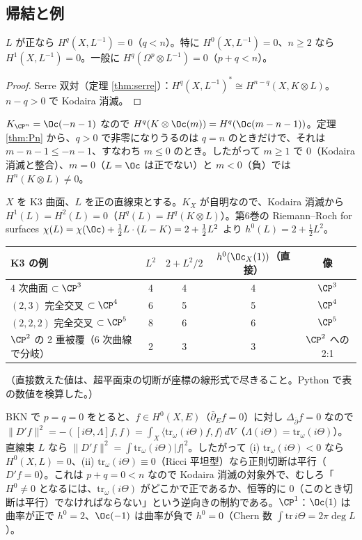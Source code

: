 \subsection{帰結と例}
\begin{cor}\label{cor:negvanish}\tP
$L$ が正なら $H^q(X,L^{-1})=0$（$q<n$）。特に $H^0(X,L^{-1})=0$、$n\ge2$ なら $H^1(X,L^{-1})=0$。一般に $H^q(\Omega^p\otimes L^{-1})=0$（$p+q<n$）。
\end{cor}
\begin{proof}
Serre 双対（定理 \ref{thm:serre}）：$H^q(X,L^{-1})^*\cong H^{n-q}(X,K\otimes L)$。$n-q>0$ で Kodaira 消滅。
\end{proof}
\begin{ex}[$\CP^n$]
$K_{\CP^n}=\Oc(-n-1)$ なので $H^q(K\otimes\Oc(m))=H^q(\Oc(m-n-1))$。定理 \ref{thm:Pn} から、$q>0$ で非零になりうるのは $q=n$ のときだけで、それは $m-n-1\le-n-1$、すなわち $m\le0$ のとき。したがって $m\ge1$ で $0$（Kodaira 消滅と整合）、$m=0$（$L=\Oc$ は正でない）と $m<0$（負）では $H^n(K\otimes L)\neq0$。
\end{ex}
\begin{ex}[K3 曲面で $h^0(L)=2+\tfrac12L^2$]\label{ex:K3h0}
$X$ を K3 曲面、$L$ を正の直線束とする。$K_X$ が自明なので、Kodaira 消滅から $H^1(L)=H^2(L)=0$（$H^q(L)=H^q(K\otimes L)$）。第6巻の Riemann--Roch for surfaces $\chi(L)=\chi(\Oc)+\frac12L\cdot(L-K)=2+\frac12L^2$ より $h^0(L)=2+\frac12L^2$。
\begin{center}\small
\begin{tabular}{lcccc}
\toprule
K3 の例 & $L^2$ & $2+L^2/2$ & $h^0(\Oc_X(1))$（直接）& 像\\\midrule
4 次曲面 $\subset\CP^3$ & 4 & 4 & 4 & $\CP^3$\\
$(2,3)$ 完全交叉 $\subset\CP^4$ & 6 & 5 & 5 & $\CP^4$\\
$(2,2,2)$ 完全交叉 $\subset\CP^5$ & 8 & 6 & 6 & $\CP^5$\\
$\CP^2$ の 2 重被覆（6 次曲線で分岐） & 2 & 3 & 3 & $\CP^2$ への 2:1 \\\bottomrule
\end{tabular}
\end{center}
（直接数えた値は、超平面束の切断が座標の線形式で尽きること。Python で表の数値を検算した。）
\end{ex}
\begin{ex}\label{ex:bochner}
BKN で $p=q=0$ をとると、$f\in H^0(X,E)$（$\bar\partial_Ef=0$）に対し $\Delta_{\bar\partial}f=0$ なので $\|D'f\|^2=-([i\Theta,\Lambda]f,f)=\int_X\langle\mathrm{tr}_\omega(i\Theta)f,f\rangle\,dV$（$\Lambda(i\Theta)=\mathrm{tr}_\omega(i\Theta)$）。直線束 $L$ なら $\|D'f\|^2=\int\mathrm{tr}_\omega(i\Theta)|f|^2$。したがって (i) $\mathrm{tr}_\omega(i\Theta)<0$ なら $H^0(X,L)=0$、(ii) $\mathrm{tr}_\omega(i\Theta)\equiv0$（Ricci 平坦型）なら正則切断は平行（$D'f=0$）。これは $p+q=0<n$ なので Kodaira 消滅の対象外で、むしろ「$H^0\ne0$ となるには、$\mathrm{tr}_\omega(i\Theta)$ がどこかで正であるか、恒等的に $0$（このとき切断は平行）でなければならない」という逆向きの制約である。$\CP^1$：$\Oc(1)$ は曲率が正で $h^0=2$、$\Oc(-1)$ は曲率が負で $h^0=0$（Chern 数 $\int\mathrm{tr}\,i\Theta=2\pi\deg L$）。
\end{ex}
